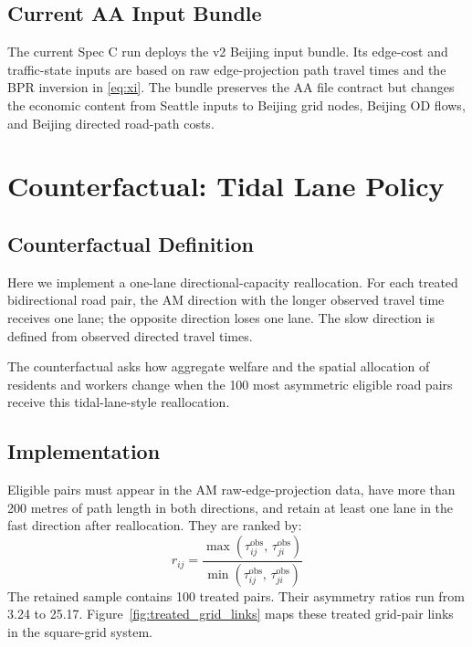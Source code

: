 \documentclass[12pt, a4paper]{article}
\begin{document}
\subsection{Current AA Input Bundle}

The current Spec C run deploys the v2 Beijing input bundle.  Its edge-cost
and traffic-state inputs are based on raw edge-projection path travel times
and the BPR inversion in \eqref{eq:xi}.  The bundle preserves the AA file
contract but changes the economic content from Seattle inputs to Beijing
grid nodes, Beijing OD flows, and Beijing directed road-path costs.


\section{Counterfactual: Tidal Lane Policy}
\label{sec:counterfactual}

\subsection{Counterfactual Definition}

Here we implement a one-lane directional-capacity reallocation.  For each treated
bidirectional road pair, the AM direction with the longer observed travel
time receives one lane; the opposite direction loses one lane.  The slow
direction is defined from observed directed travel times.

The counterfactual asks how aggregate welfare and the spatial allocation of
residents and workers change when the 100 most asymmetric eligible road
pairs receive this tidal-lane-style reallocation.

\subsection{Implementation}

Eligible pairs must appear in the AM raw-edge-projection data, have more
than 200 metres of path length in both directions, and retain at least one
lane in the fast direction after reallocation.  They are ranked by:
\begin{equation}
  r_{ij} = \frac{\max(\tau_{ij}^{\text{obs}},\, \tau_{ji}^{\text{obs}})}
                {\min(\tau_{ij}^{\text{obs}},\, \tau_{ji}^{\text{obs}})}
  \label{eq:asymratio}
\end{equation}
The retained sample contains 100 treated pairs.  Their asymmetry ratios run
from 3.24 to 25.17.  Figure~\ref{fig:treated_grid_links} maps these treated
grid-pair links in the square-grid system.
\end{document}
